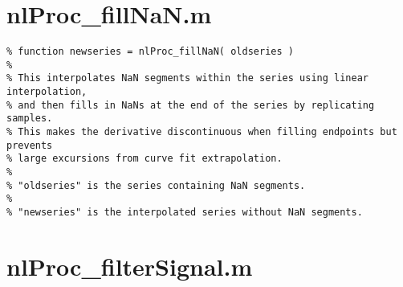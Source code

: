 \section{nlProc\_fillNaN.m}

\begin{verbatim}
% function newseries = nlProc_fillNaN( oldseries )
%
% This interpolates NaN segments within the series using linear interpolation,
% and then fills in NaNs at the end of the series by replicating samples.
% This makes the derivative discontinuous when filling endpoints but prevents
% large excursions from curve fit extrapolation.
%
% "oldseries" is the series containing NaN segments.
%
% "newseries" is the interpolated series without NaN segments.
\end{verbatim}

\section{nlProc\_filterSignal.m}

